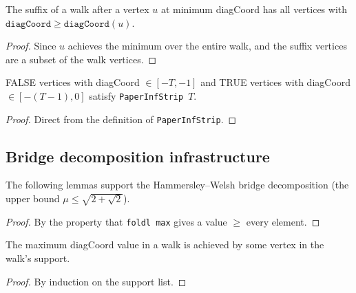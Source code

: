 \begin{lemma}
\begin{enumerate}
\begin{lemma}\label{lem:suffix-dc-bound}
\leanok
  The suffix of a walk after a vertex $u$ at minimum diagCoord
  has all vertices with $\texttt{diagCoord} \geq \texttt{diagCoord}(u)$.
\end{lemma}
\begin{proof}\leanok
  Since $u$ achieves the minimum over the entire walk, and the suffix
  vertices are a subset of the walk vertices.
\end{proof}

\begin{lemma}\label{lem:strip-from-dc}
\leanok
  FALSE vertices with diagCoord $\in [-T, -1]$ and TRUE vertices
  with diagCoord $\in [-(T{-}1), 0]$ satisfy \texttt{PaperInfStrip}~$T$.
\end{lemma}
\begin{proof}\leanok
  Direct from the definition of \texttt{PaperInfStrip}.
\end{proof}

\subsection{Bridge decomposition infrastructure}

The following lemmas support the Hammersley--Welsh bridge decomposition
(the upper bound $\mu \leq \sqrt{2+\sqrt{2}}$).

\begin{proof}\leanok
  By the property that \texttt{foldl max} gives a value $\geq$ every element.
\end{proof}

\begin{lemma}\label{lem:walk-max-dc-achieved}
\leanok
  The maximum diagCoord value in a walk is achieved by some vertex
  in the walk's support.
\end{lemma}
\begin{proof}\leanok
  By induction on the support list.
\end{proof}


\end{enumerate}
\end{lemma}

